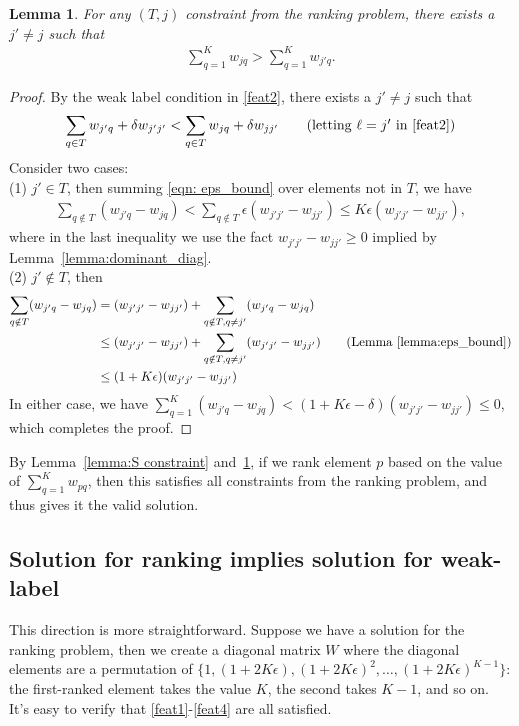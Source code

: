 \documentclass{article}
\newtheorem{lemma}[theorem]{Lemma}
\begin{document}
\begin{lemma}
\label{lemma:T constraint}
For any $(T,j)$ constraint from the ranking problem, there exists a $j'\neq j$ such that 
\begin{align*}
    \sum_{q=1}^K w_{jq} > \sum_{q=1}^K w_{j'q}. 
\end{align*}
\end{lemma}
\begin{proof}
By the weak label condition in \eqref{feat2}, there exists a $j'\neq j$ such that 
\begin{align*}
     \sum_{q\in T} w_{j'q} + \delta w_{j'j'} < \sum_{q\in T} w_{jq} + \delta w_{jj'} \tag{letting $\ell=j'$ in \eqref{feat2}}
\end{align*}
Consider two cases: \\
(1) $j'\in T$, then summing \eqref{eqn: eps_bound} over elements not in $T$, we have
\begin{align*}
    \sum_{q\notin T} (w_{j'q}-w_{jq}) < \sum_{q\notin T} \epsilon(w_{j'j'}-w_{jj'}) \leq K\epsilon(w_{j'j'}-w_{jj'}),  
\end{align*}
where in the last inequality we use the fact $w_{j'j'}-w_{jj'}\geq 0$ implied by Lemma~\ref{lemma:dominant_diag}. \\
(2) $j'\notin T$, then 
\begin{align*}
    \sum_{q\notin T} (w_{j'q}-w_{jq}) &= (w_{j'j'}-w_{jj'})+\sum_{q\notin T, q\neq j'}(w_{j'q}-w_{jq})\\
    &\leq (w_{j'j'}-w_{jj'})+\sum_{q\notin T, q\neq j'}(w_{j'j'}-w_{jj'}) \tag{Lemma~\ref{lemma:eps_bound}}\\
    &\leq (1+K\epsilon) (w_{j'j'}-w_{jj'})
\end{align*}
In either case, we have $\sum_{q=1}^K (w_{j'q}-w_{jq})<(1+K\epsilon-\delta)(w_{j'j'}-w_{jj'})\leq 0$, which completes the proof. 
\end{proof}
By Lemma~\ref{lemma:S constraint} and~\ref{lemma:T constraint}, if we rank element $p$ based on the value of $\sum_{q=1}^K w_{pq}$, then this satisfies all constraints from the ranking problem, and thus gives it the valid solution. 

\subsection{Solution for ranking implies solution for weak-label}
This direction is more straightforward. Suppose we have a solution for the ranking problem, then we create a diagonal matrix $W$ where the diagonal elements are a permutation of $\{1, (1+2K\epsilon), (1+2K\epsilon)^2, \ldots, (1+2K\epsilon)^{K-1}\}$: the first-ranked element takes the value $K$, the second takes $K-1$, and so on. It's easy to verify that \eqref{feat1}-\eqref{feat4} are all satisfied. 
\fi

\newpage
 

\end{document}
